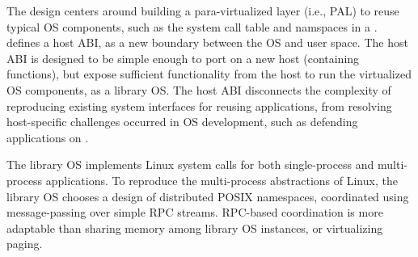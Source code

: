 \label{sec:graphene:summary}

The \graphene{} design centers around
building a para-virtualized layer (i.e., PAL) to reuse typical OS components, such as the system call table and namspaces in a \libos{}. %
\graphene{} defines a host ABI, as a new boundary between the OS and user space.
The host ABI is designed to be simple enough to port on a new host (containing \palcallnum{} functions),
but expose sufficient functionality from the host to run the virtualized OS components, as a library OS.
The host ABI disconnects the complexity of reproducing existing system interfaces for reusing applications,
from resolving host-specific challenges occurred in OS development,
such as defending applications on \sgx{}.


The \graphene{} library OS implements Linux system calls for both single-process and multi-process applications.
To reproduce the multi-process abstractions of Linux,
the library OS chooses a design of distributed POSIX namespaces,
coordinated using message-passing over simple RPC streams.
RPC-based coordination is more adaptable than sharing memory among library OS instances, or virtualizing paging.








